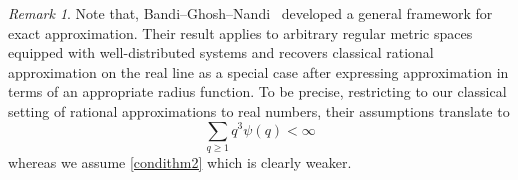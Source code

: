 \documentclass[11pt]{amsart}
\numberwithin{equation}{section}
\newcommand{\0}{\mathbf{0}}
\theoremstyle{remark}
\newtheorem{remark}{{Remark}}
\begin{document}
\begin{remark}
Note that, Bandi--Ghosh--Nandi~\cite{BandiGhoshNandi} developed a general framework for exact
approximation. Their
result applies to arbitrary regular metric spaces equipped with
well-distributed systems and recovers classical rational approximation on
the real line as a special case after expressing approximation in terms of
an appropriate radius function. To be precise, restricting to our classical setting of rational approximations to real numbers, their assumptions translate to $$\sum_{q\ge 1}q^3\psi(q)<\infty$$
whereas we assume \eqref{condithm2} which is clearly weaker. 

\end{remark}



  
\end{document}
